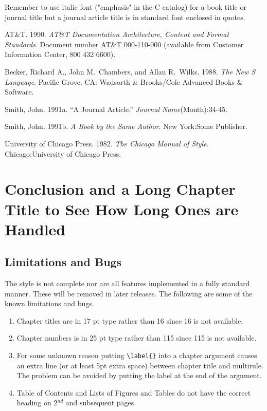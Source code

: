 Remember to use italic font ("emphasis" in the C
catalog) for a book title or journal title but a journal article
title is in standard font enclosed in quotes.

\begin{thechapterbibliography}{99}

AT\&T. 1990. {\it AT\&T Documentation Architecture, Content and Format
Standards}.  Document number AT\&T 000-110-000 (available from
Customer Information Center, 800 432 6600).

Becker, Richard A., John M.\ Chambers, and Allan
R.\ Wilks. 1988. {\it The New S Language}. Pacific Grove, CA: Wadsorth
\& Brooks/Cole Advanced Books \& Software.

Smith, John. 1991a. ``A Journal Article.'' {\it Journal Name}(Month):34-45.

Smith, John. 1991b. {\it A Book by the Same Author}. New York:Some Publisher.

University of Chicago Press. 1982. {\it The
Chicago Manual of Style}. Chicago:University of Chicago Press.
\end{thechapterbibliography}
\chapter{Conclusion and a Long Chapter Title to See How Long Ones are Handled}

\section{Limitations and Bugs\label{sec:bugs}}


The style is not complete nor are all features implemented in a fully
standard manner. These will be removed in later releases. The
following are some of the known limitations and bugs.


\begin{enumerate}
  \item Chapter titles are in 17 pt type rather than 16 since 16 is not
        available. 
  \item Chapter numbers is in 25 pt type rather than 115 since 115 is
        not available.
  \item For some unknown reason putting \verb|\label{}| into a chapter
        argument causes an extra line (or at least 5pt extra space)
        between chapter title and multirule.  The problem can be
        avoided by putting the label at the end of the argument.
  \item Table of Contents and Lists of Figures and Tables do not have
        the correct heading on 2$^{nd}$ and subsequent pages.
\end{enumerate}
